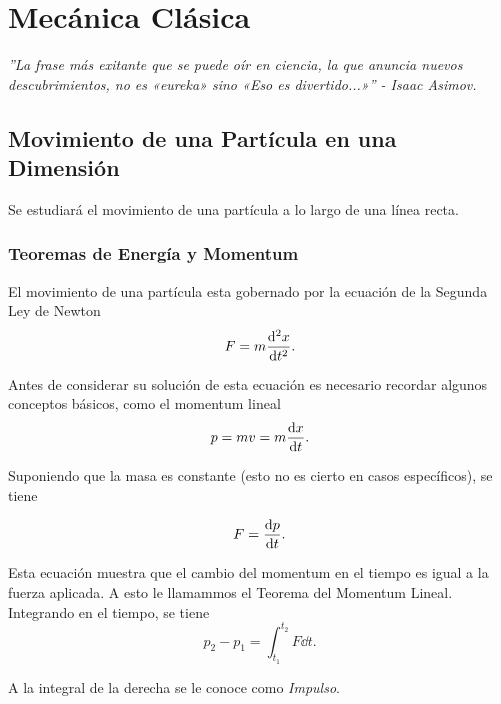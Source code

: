 \part{Mecánica Clásica}

\vspace*{\fill}

\begin{center}
	\textit{''La frase más exitante que se puede oír en ciencia, la que anuncia nuevos descubrimientos, no es «eureka» sino «Eso es divertido...»'' - Isaac Asimov.}
\end{center}

\vspace*{\fill}

\chapter{Movimiento de una Partícula en una Dimensión}

Se estudiará el movimiento de una partícula a lo largo de una línea recta.

\section{Teoremas de Energía y Momentum}
El movimiento de una partícula esta gobernado por la ecuación de la Segunda Ley de Newton
\begin{equation}
	F = m\dv[2]{x}{t}.
\end{equation}

Antes de considerar su solución de esta ecuación es necesario recordar algunos conceptos básicos, como el momentum lineal
\begin{equation}
	p = mv = m\dv{x}{t}.
\end{equation}

Suponiendo que la masa es constante (esto no es cierto en casos específicos), se tiene

\begin{equation}
	F = \dv{p}{t}.
\end{equation}

Esta ecuación muestra que el cambio del momentum en el tiempo es igual a la fuerza aplicada. A esto le llamammos el Teorema del Momentum Lineal. Integrando en el tiempo, se tiene 
\begin{equation}
	p_2 - p_1 = \int _{t_1} ^{t_2} F \dd{t}.
\end{equation}

A la integral de la derecha se le conoce como \textit{Impulso}. \\


